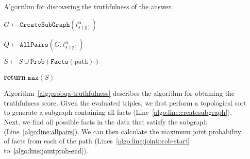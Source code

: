 \begin{algorithm}
\caption{Algorithm for discovering the truthfulness of the answer.}
\label{alg:probqa-truthfulness}
\begin{algorithmic}[1]

\State $G \leftarrow \mathtt{CreateSubGraph}(t_{s(q)}^\alpha)$ \label{algo:line:createsubgraph}

\State $Q \leftarrow \mathtt{AllPairs}(G, t_{s(q)}^\alpha)$  \label{algo:line:allpairs}

  \label{algo:line:jointprob-start}
  \State $S \leftarrow S \cup \mathtt{Prob}(\mathtt{Facts}(\text{path}))$ 
\EndFor \label{algo:line:jointprob-end}

\State \textbf{return} $\mathtt{max}(S)$
\EndProcedure
\end{algorithmic}
\end{algorithm}

Algorithm~\ref{alg:probqa-truthfulness} describes the algorithm for obtaining the truthfulness score.
Given the evaluated triples, we first perform a topological sort to generate a subgraph containing all facts (Line~\ref{algo:line:createsubgraph}).
Next, we find all possible facts in the data that satisfy the subgraph (Line~\ref{algo:line:allpairs}).
We can then calculate the maximum joint probability of facts from each of the path (Lines~\ref{algo:line:jointprob-start} to~\ref{algo:line:jointprob-end}).





